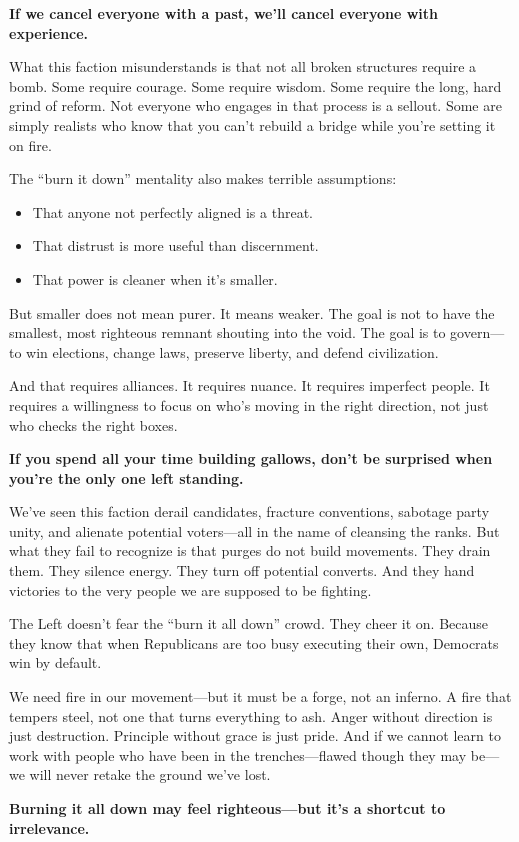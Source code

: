 \textbf{If we cancel everyone with a past, we’ll cancel everyone with experience.}

What this faction misunderstands is that not all broken structures require a bomb. Some require courage. Some require wisdom. Some require the long, hard grind of reform. Not everyone who engages in that process is a sellout. Some are simply realists who know that you can’t rebuild a bridge while you’re setting it on fire.

The ``burn it down'' mentality also makes terrible assumptions:
\begin{itemize}
    \item That anyone not perfectly aligned is a threat.
    \item That distrust is more useful than discernment.
    \item That power is cleaner when it’s smaller.
\end{itemize}

But smaller does not mean purer. It means weaker. The goal is not to have the smallest, most righteous remnant shouting into the void. The goal is to govern—to win elections, change laws, preserve liberty, and defend civilization.

And that requires alliances. It requires nuance. It requires imperfect people. It requires a willingness to focus on who’s moving in the right direction, not just who checks the right boxes.

\textbf{If you spend all your time building gallows, don’t be surprised when you’re the only one left standing.}

We’ve seen this faction derail candidates, fracture conventions, sabotage party unity, and alienate potential voters—all in the name of cleansing the ranks. But what they fail to recognize is that purges do not build movements. They drain them. They silence energy. They turn off potential converts. And they hand victories to the very people we are supposed to be fighting.

The Left doesn’t fear the ``burn it all down'' crowd. They cheer it on. Because they know that when Republicans are too busy executing their own, Democrats win by default.

We need fire in our movement—but it must be a forge, not an inferno. A fire that tempers steel, not one that turns everything to ash. Anger without direction is just destruction. Principle without grace is just pride. And if we cannot learn to work with people who have been in the trenches—flawed though they may be—we will never retake the ground we've lost.

\textbf{Burning it all down may feel righteous—but it’s a shortcut to irrelevance.}